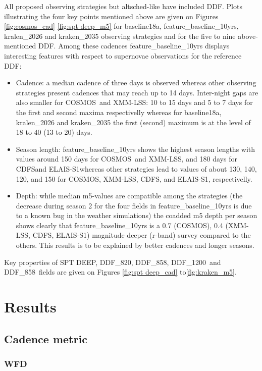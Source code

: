 \documentclass [11pt,a4paper]{article}
\newcommand{\cosmos}{COSMOS}
\newcommand{\xmmlss}{XMM-LSS}
\newcommand{\cdfs}{CDFS}
\newcommand{\elais}{ELAIS-S1}
\newcommand{\spt}{SPT DEEP}
\newcommand{\ddfa}{DDF\_820}
\newcommand{\ddfb}{DDF\_858}
\newcommand{\ddfc}{DDF\_1200}
\begin{document}
All proposed observing strategies but altsched-like have included DDF.
Plots illustrating the four key points mentioned above are given on Figures \ref{fig:cosmos_cad}-\ref{fig:spt deep_m5} for baseline18a, feature\_baseline\_10yrs, kralen\_2026 and kraken\_2035 observing strategies and for the five to nine above-mentioned DDF. Among these cadences feature\_baseline\_10yrs displays interesting features with respect to supernovae observations for the reference DDF:
\begin{itemize}
\item Cadence: a median cadence of three days is observed whereas other observing strategies present cadences that may reach up to 14 days. Inter-night gaps are also smaller for \cosmos~and \xmmlss: 10 to 15 days and 5 to 7 days for the first and second maxima respectivelly whereas  for baseline18a, kralen\_2026 and kraken\_2035 the first (second) maximum is at the level of 18 to 40 (13 to 20) days.  
\item Season length: feature\_baseline\_10yrs shows the highest season lengths with values around 150 days for \cosmos~and \xmmlss, and 180 days for \cdfs and \elais whereas other strategies lead to values of about 130, 140, 120, and 150 for \cosmos, \xmmlss, \cdfs, and \elais, respectivelly.
\item Depth: while median m5-values are compatible among the strategies (the decrease during season 2 for the four fields in  feature\_baseline\_10yrs is due to a known bug in the weather simulations) the coadded m5 depth per season shows clearly that feature\_baseline\_10yrs is a 0.7 (\cosmos), 0.4 (\xmmlss, \cdfs, \elais) magnitude deeper (r-band) survey compared to the others. This results is to be explained by better cadences and longer seasons.
 
\end{itemize}
Key properties of \spt, \ddfa, \ddfb, \ddfc~and \ddfb~fields are given on Figures \ref{fig:spt deep_cad} to\ref{fig:kraken_m5}.


\section{ Results}

\subsection{ Cadence metric }

\subsubsection{ WFD}
\end{document}
